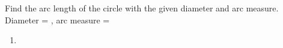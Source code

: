 Find the arc length of the circle with the given diameter and arc measure.
\newline
Diameter = , arc measure = \degree
\newline
\begin{enumerate}
    \item
\end{enumerate}

